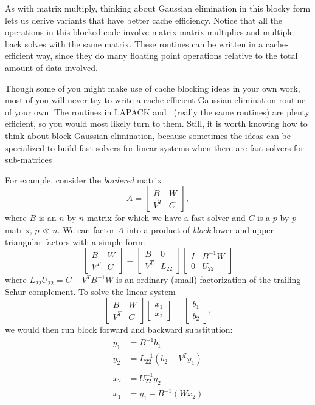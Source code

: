 As with matrix multiply, thinking about Gaussian elimination in this
blocky form lets us derive variants that have better cache efficiency.
Notice that all the operations in this blocked code involve matrix-matrix
multiplies and multiple back solves with the same matrix.  These routines
can be written in a cache-efficient way, since they do many floating point
operations relative to the total amount of data involved.

Though some of you might make use of cache blocking ideas in your own
work, most of you will never try to write a cache-efficient Gaussian
elimination routine of your own.  The routines in LAPACK and \matlab\
(really the same routines) are plenty efficient, so you would most
likely turn to them.  Still, it is worth knowing how to think about
block Gaussian elimination, because sometimes the ideas can be specialized
to build fast solvers for linear systems when there are fast solvers for
sub-matrices

For example, consider the {\em bordered} matrix
\[
  A = \begin{bmatrix} B & W \\ V^T & C \end{bmatrix},
\]
where $B$ is an $n$-by-$n$ matrix for which we have a fast
solver and $C$ is a $p$-by-$p$ matrix, $p \ll n$.
We can factor $A$ into a product of {\em block} lower and
upper triangular factors with a simple form:
\[
  \begin{bmatrix} B & W \\ V^T & C \end{bmatrix} =
  \begin{bmatrix} B   & 0 \\ V^T & L_{22} \end{bmatrix}
  \begin{bmatrix} I & B^{-1} W \\ 0 & U_{22} \end{bmatrix}
\]
where $L_{22} U_{22} = C-V^T B^{-1} W$ is an ordinary (small) factorization
of the trailing Schur complement.  To solve the linear system
\[
  \begin{bmatrix} B & W \\ V^T & C \end{bmatrix}
  \begin{bmatrix} x_1 \\ x_2 \end{bmatrix} =
  \begin{bmatrix} b_1 \\ b_2 \end{bmatrix},
\]
we would then run block forward and backward substitution:
\begin{align*}
  y_1 &= B^{-1} b_1 \\
  y_2 &= L_{22}^{-1} \left( b_2 - V^T y_1 \right) \\
\\
  x_2 &= U_{22}^{-1} y_2 \\
  x_1 &= y_1-B^{-1} (W x_2)
\end{align*}
